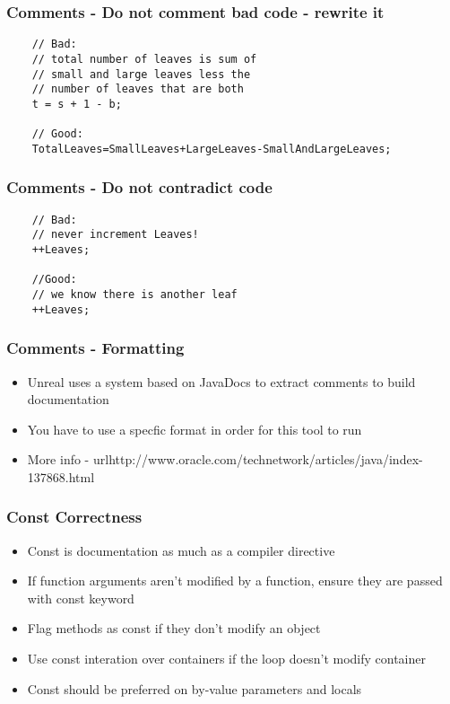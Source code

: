 \begin{frame}[fragile]
  \frametitle{Comments - Do not comment bad code - rewrite it}
  \begin{lstlisting}
    // Bad:
    // total number of leaves is sum of
    // small and large leaves less the
    // number of leaves that are both
    t = s + 1 - b;

    // Good:
    TotalLeaves=SmallLeaves+LargeLeaves-SmallAndLargeLeaves;
  \end{lstlisting}
\end{frame}

\begin{frame}[fragile]
  \frametitle{Comments - Do not contradict code}
  \begin{lstlisting}
    // Bad:
    // never increment Leaves!
    ++Leaves;

    //Good:
    // we know there is another leaf
    ++Leaves;
  \end{lstlisting}
\end{frame}

\begin{frame}
  \frametitle{Comments - Formatting}
  \begin{itemize}
    \item Unreal uses a system based on JavaDocs to extract comments to build documentation
    \item You have to use a specfic format in order for this tool to run
    \item More info - url{http://www.oracle.com/technetwork/articles/java/index-137868.html}
  \end{itemize}
\end{frame}

\begin{frame}
  \frametitle{Const Correctness}
  \begin{itemize}
    \item Const is documentation as much as a compiler directive
    \item If function arguments aren't modified by a function, ensure they are passed with const keyword
    \item Flag methods as const if they don't modify an object
    \item Use const interation over containers if the loop doesn't modify container
    \item Const should be preferred on by-value parameters and locals
  \end{itemize}
\end{frame}

